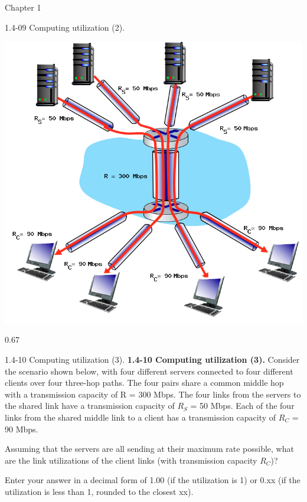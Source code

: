 \documentclass[a4paper]{article}
\begin{document}
\begin{quiz}{Chapter 1}
\begin{shortanswer}[points=1,shuffle=true]{1.4-09 Computing utilization (2).}
\begin{center}
\includegraphics[width=.7\linewidth]{figs/1.4.7.png}
\end{center}
\item 0.67
\end{shortanswer}

\begin{shortanswer}[points=1,shuffle=true]{1.4-10 Computing utilization (3).}
\textbf{1.4-10 Computing utilization (3).} 
Consider the scenario shown below, with four different servers connected to four different clients over four three-hop paths. The four pairs share a common middle hop with a transmission capacity of R = 300 Mbps. The four links from the servers to the shared link have a transmission capacity of $R_S$ = 50 Mbps. Each of the four links from the shared middle link to a client has a transmission capacity of $R_C$ = 90 Mbps. 

Assuming that the servers are all sending at their maximum rate possible, what are the link utilizations of the client links (with transmission capacity $R_C$)? 

Enter your answer in a decimal form of 1.00 (if the utilization is 1) or 0.xx (if the utilization is less than 1, rounded to the closest xx).


\end{shortanswer}
\end{quiz}
\end{document}
